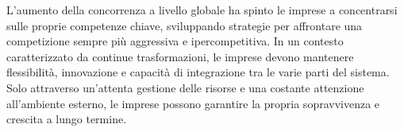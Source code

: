 L’aumento della concorrenza a livello globale ha spinto le imprese a concentrarsi sulle proprie competenze chiave, sviluppando strategie per affrontare una competizione sempre più aggressiva e ipercompetitiva. In un contesto caratterizzato da continue trasformazioni, le imprese devono mantenere flessibilità, innovazione e capacità di integrazione tra le varie parti del sistema. Solo attraverso un’attenta gestione delle risorse e una costante attenzione all’ambiente esterno, le imprese possono garantire la propria sopravvivenza e crescita a lungo termine.